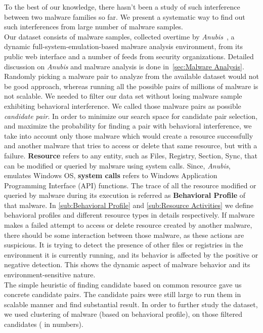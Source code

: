 To the best of our knowledge, there hasn't been a study of such interference between two malware families so far.
We present a systematic way to find out such interferences from large number of malware samples.\\
Our dataset consists of {\gettotalmalwarei{}} malware samples, collected overtime by \emph{Anubis}~\cite[]{anubis}, a dynamic full-system-emulation-based malware analysis environment, from its public web interface and a number of feeds from security organizations.
Detailed discussion on \emph{Anubis} and malware analysis is done in~\autoref{sec:Malware Analysis}.
Randomly picking a malware pair to analyze from the available dataset would not be good approach, whereas running all the possible pairs of millions of malware is not scalable.
We needed to filter our data set without losing malware sample exhibiting behavioral interference.
We called those malware pairs as possible \emph{candidate pair}.
In order to minimize our search space for candidate pair selection, and maximize the probability for finding a pair with behavioral interference, we take into account only those malware which would create a resource successfully and another malware that tries to access or delete that same resource, but with a failure.
\textbf{Resource} refers to any entity, such as Files, Registry, Section, Sync, that can be modified or queried by malware using system calls.
Since, \emph{Anubis}, emulates Windows OS, \textbf{system calls} refers to Windows Application Programming Interface (API) functions.
The trace of all the resource modified or queried by malware during its execution is referred as \textbf{Behavioral Profile} of that malware.
In \autoref{sub:Behavioral Profile} and \autoref{sub:Resource Activities} we define behavioral profiles and different resource types in details respectively.
If malware makes a failed attempt to access or delete resource created by another malware, there should be some interaction between those malware, as these actions are suspicious.
It is trying to detect the presence of other files or registries in the environment it is currently running, and its behavior is affected by the positive or negative detection.
This shows the dynamic aspect of malware behavior and its environment-sensitive nature.\\
The simple heuristic of finding candidate based on common resource gave us concrete candidate pairs.
The candidate pairs were still large to run them in scalable manner and find substantial result.
In order to further study the dataset, we used clustering of malware (based on behavioral profile), on those filtered candidates (\gettotalmalwareiii{} in numbers).
